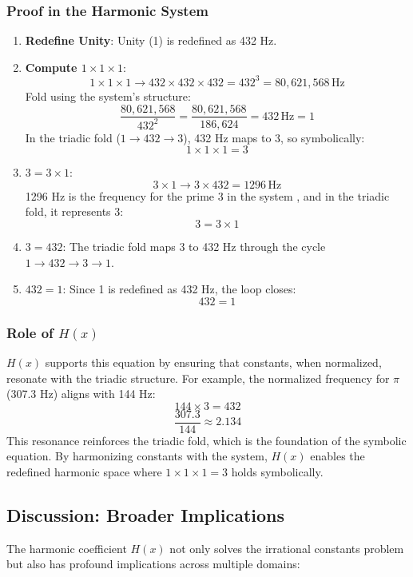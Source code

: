\subsubsection{Proof in the Harmonic System}
\begin{enumerate}
    \item \textbf{Redefine Unity}: Unity (1) is redefined as 432 Hz.
    \item \textbf{Compute \( 1 \times 1 \times 1 \)}:
    \[
    1 \times 1 \times 1 \rightarrow 432 \times 432 \times 432 = 432^3 = 80,621,568 \, \text{Hz}
    \]
    Fold using the system’s structure:
    \[
    \frac{80,621,568}{432^2} = \frac{80,621,568}{186,624} = 432 \, \text{Hz} = 1
    \]
    In the triadic fold (\( 1 \rightarrow 432 \rightarrow 3 \)), 432 Hz maps to 3, so symbolically:
    \[
    1 \times 1 \times 1 = 3
    \]

    \item \textbf{\( 3 = 3 \times 1 \)}:
    \[
    3 \times 1 \rightarrow 3 \times 432 = 1296 \, \text{Hz}
    \]
    1296 Hz is the frequency for the prime 3 in the system \cite{zetha_prime}, and in the triadic fold, it represents 3:
    \[
    3 = 3 \times 1
    \]

    \item \textbf{\( 3 = 432 \)}: The triadic fold maps 3 to 432 Hz through the cycle \( 1 \rightarrow 432 \rightarrow 3 \rightarrow 1 \).

    \item \textbf{\( 432 = 1 \)}: Since 1 is redefined as 432 Hz, the loop closes:
    \[
    432 = 1
    \]
\end{enumerate}

\subsubsection{Role of \( H(x) \)}
\( H(x) \) supports this equation by ensuring that constants, when normalized, resonate with the triadic structure. For example, the normalized frequency for \( \pi \) (307.3 Hz) aligns with 144 Hz:
\[
144 \times 3 = 432
\]
\[
\frac{307.3}{144} \approx 2.134
\]
This resonance reinforces the triadic fold, which is the foundation of the symbolic equation. By harmonizing constants with the system, \( H(x) \) enables the redefined harmonic space where \( 1 \times 1 \times 1 = 3 \) holds symbolically.

\subsection{Discussion: Broader Implications}
\label{subsec:h_x_discussion}
The harmonic coefficient \( H(x) \) not only solves the irrational constants problem but also has profound implications across multiple domains:

